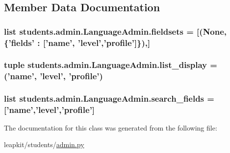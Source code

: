 \subsection{Member Data Documentation}
\hypertarget{classstudents_1_1admin_1_1_language_admin_adb64e35cb2808fcb92ba85970394ed60}{
\subsubsection[{fieldsets}]{\setlength{\rightskip}{0pt plus 5cm}list students.\-admin.\-Language\-Admin.\-fieldsets = \mbox{[}(None, \{'fields' \-: \mbox{[}'name', 'level','profile'\mbox{]}\}),\mbox{]}\hspace{0.3cm}{\ttfamily [static]}}}\label{classstudents_1_1admin_1_1_language_admin_adb64e35cb2808fcb92ba85970394ed60}
\hypertarget{classstudents_1_1admin_1_1_language_admin_a36a061d2b5f97c82377a82b5a611fe38}{
\subsubsection[{list\-\_\-display}]{\setlength{\rightskip}{0pt plus 5cm}tuple students.\-admin.\-Language\-Admin.\-list\-\_\-display = ('name', 'level', 'profile')\hspace{0.3cm}{\ttfamily [static]}}}\label{classstudents_1_1admin_1_1_language_admin_a36a061d2b5f97c82377a82b5a611fe38}
\hypertarget{classstudents_1_1admin_1_1_language_admin_a810be0e4fc8b533d9e02cc3bbe7bc1dc}{
\subsubsection[{search\-\_\-fields}]{\setlength{\rightskip}{0pt plus 5cm}list students.\-admin.\-Language\-Admin.\-search\-\_\-fields = \mbox{[}'name','level','profile'\mbox{]}\hspace{0.3cm}{\ttfamily [static]}}}\label{classstudents_1_1admin_1_1_language_admin_a810be0e4fc8b533d9e02cc3bbe7bc1dc}


The documentation for this class was generated from the following file\-:\begin{DoxyCompactItemize}
\item 
leapkit/students/\hyperlink{admin_8py}{admin.\-py}\end{DoxyCompactItemize}
